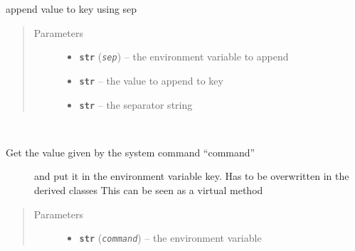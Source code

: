 \documentclass[a4paper,10pt,english]{sphinxmanual}
\begin{document}
\begin{fulllineitems}
\begin{fulllineitems}
\end{fulllineitems}


\begin{fulllineitems}
\label{commands/apidoc/src:src.fileEnviron.FileEnviron.append_value}
append value to key using sep
\begin{quote}\begin{description}
\item[{Parameters}] \leavevmode\begin{itemize}
\item {} 
\textbf{\texttt{str}} (\emph{\texttt{sep}}) -- the environment variable to append

\item {} 
\textbf{\texttt{str}} -- the value to append to key

\item {} 
\textbf{\texttt{str}} -- the separator string

\end{itemize}

\end{description}\end{quote}

\end{fulllineitems}


\begin{fulllineitems}
\label{commands/apidoc/src:src.fileEnviron.FileEnviron.command_value}~\begin{description}
\item[{Get the value given by the system command ``command'' }] \leavevmode
and put it in the environment variable key.
Has to be overwritten in the derived classes
This can be seen as a virtual method

\end{description}
\begin{quote}\begin{description}
\item[{Parameters}] \leavevmode\begin{itemize}
\item {} 
\textbf{\texttt{str}} (\emph{\texttt{command}}) -- the environment variable


\end{itemize}
\end{description}
\end{quote}
\end{fulllineitems}
\end{fulllineitems}
\end{document}
